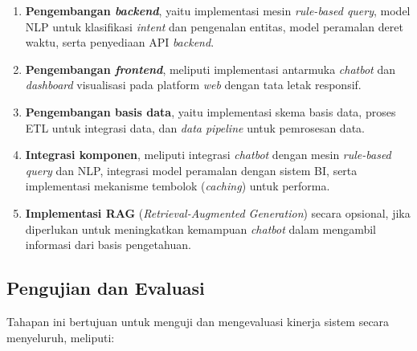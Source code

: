 \begin{enumerate}[label=\alph*.]
  \item \textbf{Pengembangan \textit{backend}}, yaitu implementasi mesin \textit{rule-based query}, model NLP untuk klasifikasi \textit{intent} dan pengenalan entitas, model peramalan deret waktu, serta penyediaan API \textit{backend}.
  
  \item \textbf{Pengembangan \textit{frontend}}, meliputi implementasi antarmuka \textit{chatbot} dan \textit{dashboard} visualisasi pada platform \textit{web} dengan tata letak responsif.
  
  \item \textbf{Pengembangan basis data}, yaitu implementasi skema basis data, proses ETL untuk integrasi data, dan \textit{data pipeline} untuk pemrosesan data.
  
  \item \textbf{Integrasi komponen}, meliputi integrasi \textit{chatbot} dengan mesin \textit{rule-based query} dan NLP, integrasi model peramalan dengan sistem BI, serta implementasi mekanisme tembolok (\textit{caching}) untuk performa.
  
  \item \textbf{Implementasi RAG} (\textit{Retrieval-Augmented Generation}) secara opsional, jika diperlukan untuk meningkatkan kemampuan \textit{chatbot} dalam mengambil informasi dari basis pengetahuan.
\end{enumerate}

\subsection{Pengujian dan Evaluasi}

Tahapan ini bertujuan untuk menguji dan mengevaluasi kinerja sistem secara menyeluruh, meliputi:

